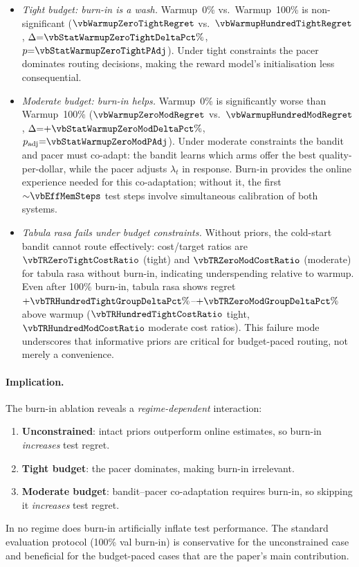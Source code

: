 \begin{itemize}[nosep,leftmargin=*]
  \item \emph{Tight budget: burn-in is a wash.}
    Warmup~0\% vs.\ Warmup~100\% is non-significant
    ($\vbWarmupZeroTightRegret$ vs.\ $\vbWarmupHundredTightRegret$, $\Delta{=}\vbStatWarmupZeroTightDeltaPct\%$, $p{=}\vbStatWarmupZeroTightPAdj$).
    Under tight constraints the pacer dominates routing decisions,
    making the reward model's initialisation less consequential.
  \item \emph{Moderate budget: burn-in helps.}
    Warmup~0\% is significantly worse than Warmup~100\%
    ($\vbWarmupZeroModRegret$ vs.\ $\vbWarmupHundredModRegret$, $\Delta{=}{+}\vbStatWarmupZeroModDeltaPct\%$,
    $p_\mathrm{adj}{=}\vbStatWarmupZeroModPAdj$).
    Under moderate constraints the bandit and pacer must co-adapt: the
    bandit learns which arms offer the best quality-per-dollar, while
    the pacer adjusts $\lambda_t$ in response.  Burn-in provides the
    online experience needed for this co-adaptation; without it, the
    first ${\sim}\vbEffMemSteps$ test steps involve simultaneous calibration of
    both systems.
  \item \emph{Tabula rasa fails under budget constraints.}
    Without priors, the cold-start bandit cannot route effectively:
    cost/target ratios are $\vbTRZeroTightCostRatio$ (tight) and
    $\vbTRZeroModCostRatio$ (moderate) for tabula rasa without burn-in,
    indicating underspending relative to warmup.  Even after 100\%
    burn-in, tabula rasa shows
    regret $+\vbTRHundredTightGroupDeltaPct\%$--$+\vbTRZeroModGroupDeltaPct\%$
    above warmup ($\vbTRHundredTightCostRatio$ tight,
    $\vbTRHundredModCostRatio$ moderate cost ratios).
    This failure mode underscores that informative priors
    are critical for budget-paced routing, not merely a convenience.
\end{itemize}

\paragraph{Implication.}
The burn-in ablation reveals a \emph{regime-dependent} interaction:
\begin{enumerate}[nosep,leftmargin=*]
  \item \textbf{Unconstrained}: intact priors outperform online
    estimates, so burn-in \emph{increases} test regret.
  \item \textbf{Tight budget}: the pacer dominates, making burn-in
    irrelevant.
  \item \textbf{Moderate budget}: bandit--pacer co-adaptation requires
    burn-in, so skipping it \emph{increases} test regret.
\end{enumerate}
In no regime does burn-in artificially inflate test performance.
The standard evaluation protocol (100\% val burn-in) is conservative
for the unconstrained case and beneficial for the budget-paced cases
that are the paper's main contribution.

